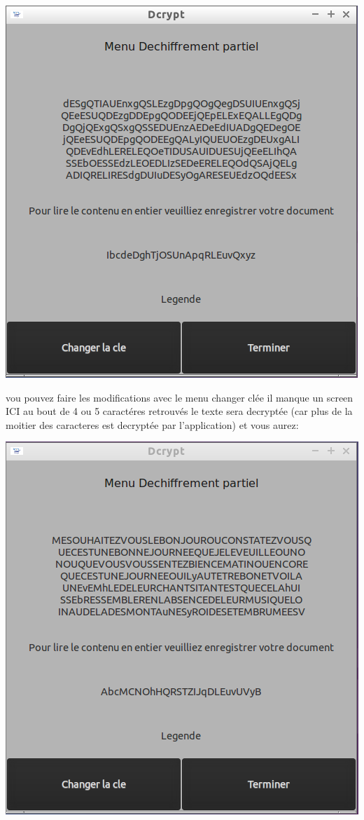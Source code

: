 \documentclass[a4]{article}
\begin{document}
			\begin{center}\includegraphics[scale=0.4]{13.png}\end{center}
			vou pouvez faire les modifications avec le menu changer clée 
			il manque un screen ICI
			au bout de 4 ou 5 caractéres retrouvés le texte sera decryptée (car plus de la moitier 
			des caracteres est decryptée par l'application) et vous aurez:
			\begin{center}\includegraphics[scale=0.4]{11.png}\end{center}
\end{document}
